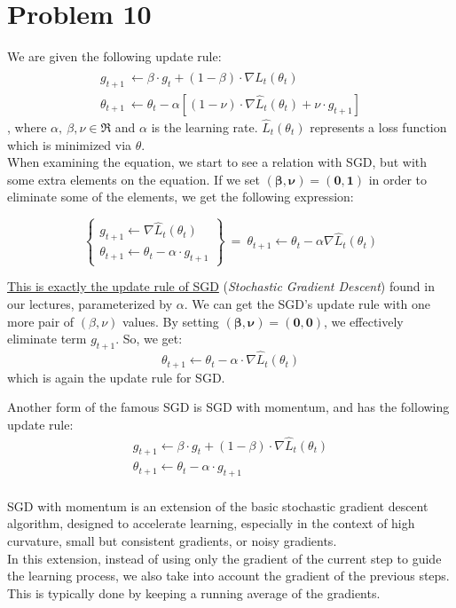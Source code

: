 \section{Problem 10}

We are given the following update rule:
\begin{equation}
\begin{array}{l}{{g_{t+1}\ \leftarrow\beta\cdot g_{t}+(1-\beta)\cdot\nabla \hat{L}_{t}(\theta_{t})}}\\ {{\theta_{t+1}\ \leftarrow\theta_{t}-\alpha\left[(1-\nu)\cdot\nabla\hat{L}_{t}(\theta_{t})+\nu\cdot g_{t+1}\right]}}\end{array}
\label{eq:qhm_equation}
\end{equation}
, where $\alpha,\ \beta, \nu \in \Re$ and $\alpha$ is the learning rate.
$\hat{L}_{t}\left(\theta_{t}\right)$ represents a loss function which is minimized via $\theta$.\\

When examining the equation, we start to see a relation with SGD, but with some extra elements on the equation.
If we set $\mathbf{\left(\beta, \nu\right) = \left(0,1\right)}$ in order to eliminate some of the elements, we get the following expression:

\[
\left\{
\begin{array}{l}
	g_{t+1} \leftarrow \nabla \hat{L}_{t}\left(\theta_{t}\right)\\
	\theta_{t+1}\leftarrow\theta_{t}-\alpha \cdot g_{t+1}
\end{array}
\right\} \ =\  \theta_{t+1} \leftarrow \theta_{t} - \alpha \nabla \hat{L}_{t} \left(\theta_{t}\right)
\]
\vspace{1mm}

\underline{This is exactly the update rule of SGD} (\textit{Stochastic Gradient Descent}) found in our lectures, parameterized by $\alpha$.
We can get the SGD's update rule with one more pair of $\left(\beta, \nu  \right)$ values. By setting $\mathbf{\left(\beta, \nu\right) = \left(0,0\right)}$, we effectively eliminate term $g_{t+1}$. So, we get:
\[
\theta_{t+1}\leftarrow\theta_{t}-\alpha\cdot\nabla\hat{L}_{t}(\theta_{t})
\]
which is again the update rule for SGD.

Another form of the famous SGD is SGD with momentum, and has the following update rule:
\[
\begin{array}{l}
	{{g_{t+1}\leftarrow\beta\cdot g_{t}+(1-\beta) \cdot \nabla \hat{L}_{t}(\theta_{t})}}\\ {{\theta_{t+1}\leftarrow\theta_{t}-\alpha\cdot g_{t+1}}}
	\end{array}
\]
\\
SGD with momentum is an extension of the basic stochastic gradient descent algorithm, designed to accelerate learning, especially in the context of high curvature, small but consistent gradients, or noisy gradients. \\
In this extension, instead of using only the gradient of the current step to guide the learning process, we also take into account the gradient of the previous steps. This is typically done by keeping a running average of the gradients.\\

